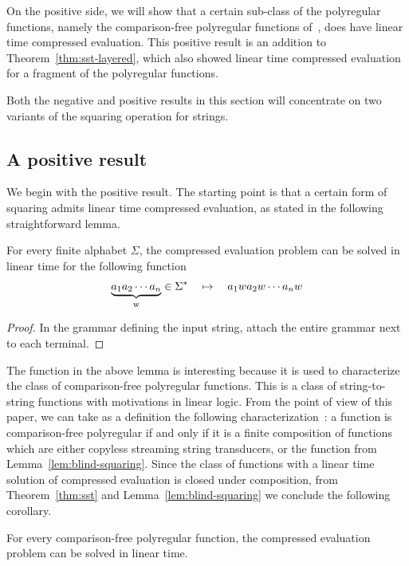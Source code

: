 \documentclass{article}
\begin{document}
On the positive side, we will show that a certain sub-class of the polyregular functions, namely the comparison-free polyregular functions of~\cite{NguyenNP21}, does have linear time compressed evaluation. This positive result is an addition to Theorem~\ref{thm:sst-layered}, which also showed linear time compressed evaluation for a fragment of the polyregular functions. 

Both the negative and positive results in this section will concentrate on two variants of the squaring operation for strings. 

\subsection{A positive result}
We begin with the positive result. The starting point is that a certain form of squaring admits linear time compressed evaluation, as stated in the following straightforward lemma. 
\begin{lemma}\label{lem:blind-squaring}
    For every finite alphabet $\Sigma$, the  compressed evaluation problem can be solved in  linear time  for the  following function
    \begin{align*}
    \myunderbrace{a_1 a_2 \cdots a_n}{w} \in \Sigma^*  \quad \mapsto  \quad a_1w a_2w \cdots a_n w
    \end{align*}
\end{lemma}
\begin{proof}
    In the grammar defining the input string, attach the entire grammar next to each terminal.
\end{proof}

The function in the above lemma is interesting because it is used to characterize the class of comparison-free polyregular functions. This is a class of string-to-string functions with motivations in linear logic. From the point of view of this paper, we can take as a definition the following characterization~\cite{NguyenNP21}: a function is comparison-free polyregular if and only if it is a finite composition of functions which are either copyless streaming string transducers, or the function from Lemma~\ref{lem:blind-squaring}. Since the class of functions with a linear time solution of compressed evaluation is closed under composition, from Theorem~\ref{thm:sst} and Lemma~\ref{lem:blind-squaring} we conclude the following corollary. 

\begin{corollary}\label{cor:blind}
    For every comparison-free polyregular function, the compressed evaluation problem can be solved in linear time.
\end{corollary}
\end{document}
